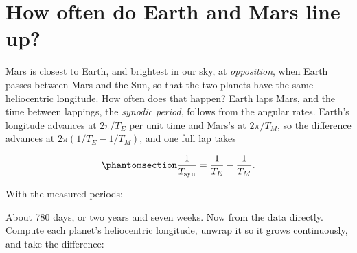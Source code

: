 \documentclass[
  10.5pt,
  letterpaper,
]{scrbook}
\newenvironment{Shaded}{\begin{snugshade}}{\end{snugshade}}
\newcommand{\CommentTok}[1]{\textcolor[rgb]{0.00,0.00,0.00}{\textit{#1}}}
\newcommand{\DecValTok}[1]{\textcolor[rgb]{0.00,0.00,0.00}{#1}}
\newcommand{\NormalTok}[1]{\textcolor[rgb]{0.00,0.00,0.00}{#1}}
\newcommand{\OtherTok}[1]{\textcolor[rgb]{0.00,0.00,0.00}{#1}}
\newcommand{\SpecialCharTok}[1]{\textcolor[rgb]{0.00,0.00,0.00}{#1}}
\newcommand{\StringTok}[1]{\textcolor[rgb]{0.00,0.00,0.00}{#1}}
\theoremstyle{definition}
\theoremstyle{plain}
\theoremstyle{remark}
\begin{document}
\section{How often do Earth and Mars line
up?}\label{how-often-do-earth-and-mars-line-up}

Mars is closest to Earth, and brightest in our sky, at
\emph{opposition}, when Earth passes between Mars and the Sun, so that
the two planets have the same heliocentric longitude. How often does
that happen? Earth laps Mars, and the time between lappings, the
\emph{synodic period}, follows from the angular rates. Earth's longitude
advances at \(2\pi/T_E\) per unit time and Mars's at \(2\pi/T_M\), so
the difference advances at \(2\pi(1/T_E - 1/T_M)\), and one full lap
takes

\begin{equation}\protect\phantomsection\label{eq-synodic}{
\frac{1}{T_{\mathrm{syn}}} = \frac{1}{T_E} - \frac{1}{T_M}.
}\end{equation}

With the measured periods:

\begin{Shaded}
\end{Shaded}

About 780 days, or two years and seven weeks. Now from the data
directly. Compute each planet's heliocentric longitude, unwrap it so it
grows continuously, and take the difference:
\end{document}
